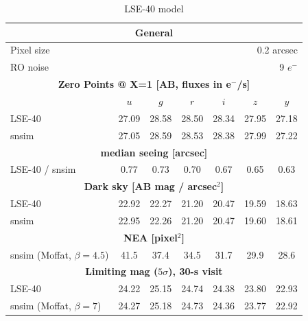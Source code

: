 \documentclass[\docopts]{\docclass}
\begin{document}
\begin{table}
\begin{center}
\caption{LSE-40 model}
\label{tab:lse40}
\begin{tabular}{l|cccccc}
\hline 
\hline 
\multicolumn{7}{c}{{\bf General}} \\
\hline
Pixel size & \multicolumn{6}{r}{0.2 arcsec} \\
RO noise   & \multicolumn{6}{r}{9 $e^-$}    \\
\hline
\multicolumn{7}{c}{{\bf Zero Points @ X=1 [AB, fluxes in e$^-$/s]}} \\
\hline
           &  $u$ & $g$ & $r$ & $i$ & $z$ & $y$ \\
LSE-40     & 27.09 & 28.58 & 28.50 & 28.34 & 27.95 & 27.18 \\
snsim      & 27.05 & 28.59 & 28.53 & 28.38 & 27.99 & 27.22 \\
\hline
\multicolumn{7}{c}{{\bf median seeing [arcsec]}} \\
\hline
LSE-40 / snsim  &  0.77 &  0.73 &  0.70 &  0.67 &  0.65 &  0.63 \\
\hline
\multicolumn{7}{c}{{\bf Dark sky [AB mag / arcsec$^2$]}}   \\
\hline
LSE-40     & 22.92 & 22.27 & 21.20 & 20.47 & 19.59 & 18.63 \\
snsim      & 22.95 & 22.26 & 21.20 & 20.47 & 19.60 & 18.61 \\
\hline
\multicolumn{7}{c}{{\bf NEA [pixel$^2$]}}   \\
\hline
snsim (Moffat, $\beta=4.5$)     & 41.5  & 37.4  & 34.5  & 31.7 & 29.9  & 28.6  \\
\hline
\multicolumn{7}{c}{{\bf Limiting mag ($5 \sigma$), 30-s visit}}   \\
\hline
LSE-40                        & 24.22  &  25.15 &  24.74  &  24.38  &  23.80  &  22.93  \\
snsim (Moffat, $\beta=7$)     & 24.27  &  25.18 &  24.73  &  24.36  &  23.77  &  22.92  \\
\hline
\end{tabular}
\end{center}
\end{table}
\end{document}
